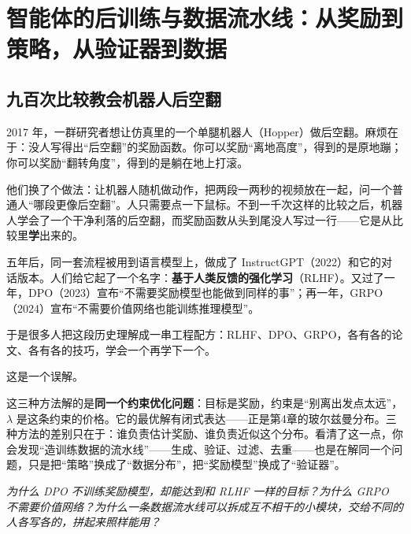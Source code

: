 \chapter{智能体的后训练与数据流水线：从奖励到策略，从验证器到数据}

\section*{九百次比较教会机器人后空翻}


2017 年，一群研究者想让仿真里的一个单腿机器人（Hopper）做后空翻。麻烦在于：没人写得出“后空翻”的奖励函数。你可以奖励“离地高度”，得到的是原地蹦；你可以奖励“翻转角度”，得到的是躺在地上打滚。

他们换了个做法：让机器人随机做动作，把两段一两秒的视频放在一起，问一个普通人“哪段更像后空翻”。人只需要点一下鼠标。不到一千次这样的比较之后，机器人学会了一个干净利落的后空翻，而奖励函数从头到尾没人写过一行——它是从比较里\textbf{学}出来的。

五年后，同一套流程被用到语言模型上，做成了 InstructGPT（2022）和它的对话版本。人们给它起了一个名字：\textbf{基于人类反馈的强化学习}（RLHF）。又过了一年，DPO（2023）宣布“不需要奖励模型也能做到同样的事”；再一年，GRPO（2024）宣布“不需要价值网络也能训练推理模型”。

于是很多人把这段历史理解成一串工程配方：RLHF、DPO、GRPO，各有各的论文、各有各的技巧，学会一个再学下一个。

这是一个误解。

这三种方法解的是\textbf{同一个约束优化问题}：目标是奖励，约束是“别离出发点太远”，$\lambda$ 是这条约束的价格。它的最优解有闭式表达——正是第4章的玻尔兹曼分布。三种方法的差别只在于：谁负责估计奖励、谁负责近似这个分布。看清了这一点，你会发现“造训练数据的流水线”——生成、验证、过滤、去重——也是在解同一个问题，只是把“策略”换成了“数据分布”，把“奖励模型”换成了“验证器”。

\vspace{0.5cm}
\noindent\textit{为什么 DPO 不训练奖励模型，却能达到和 RLHF 一样的目标？为什么 GRPO 不需要价值网络？为什么一条数据流水线可以拆成互不相干的小模块，交给不同的人各写各的，拼起来照样能用？}

